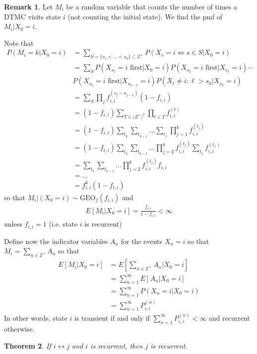 \documentclass[11pt]{amsart}
\newtheorem{theorem}{Theorem}[section]
\theoremstyle{definition}
\newtheorem{remark}[theorem]{Remark}
\numberwithin{equation}{section}
\begin{document}
 \begin{remark}
     Let $M_i$ be a random variable that counts the number of times a DTMC visits state $i$ (not counting the initial state). We find the pmf of $M_i|X_0=i$.

     Note that
     \begin{align*}
         P(M_i=k|X_0=i)&=\sum_{S=\{s_1<\ldots<s_k\}\subset\mathbb Z^+}P(X_s=i\iff s\in S|X_0=i)\\
         &=\sum_{S}P(X_{s_1}=i\text{ first}|X_0=i)P(X_{s_2}=i\text{ first}|X_{s_1}=i)\cdots \\&P(X_{s_k}=i\text{ first}|X_{s_{k-1}}=i)P(X_\ell\ne i:\ell>s_k|X_{s_k}=i)\\
         &=\sum_{S}\prod_jf_{i,i}^{(s_j-s_{j-1})}(1-f_{i,i})\\
         &=(1-f_{i,i})\sum_{T\in\mathbb (Z^+)^k}\prod_{t\in T}f_{i,i}^{(t)}\\
         &=(1-f_{i,i})\sum_{t_k}\sum_{t_{k-1}}\ldots\sum_{t_1}\prod_{j=1}^k f^{(t_j)}_{i,i}\\
         &=(1-f_{i,i})\sum_{t_k}\sum_{t_{k-1}}\ldots\prod_{j=2}^kf_{i,i}^{(t_j)}\sum_{t_1}f_{i,i}^{(t_1)}\\
         &=\sum_{t_k}\sum_{t_{k-1}}\ldots\prod_{j=2}^kf_{i,i}^{(t_j)}f_{i,i}\\
         &=\ldots\\
         &=f_{i,i}^k(1-f_{i,i})
     \end{align*}
     so that $M_i|(X_0=i)\sim\mathrm{GEO}_f(f_{i,i})$ and
     \begin{align*}
         E[M_i|X_0=i]=\frac{f_{i,i}}{1-f_{i,i}}<\infty
     \end{align*}
     unless $f_{i,i}=1$ (i.e. state $i$ is recurrent)

     Define now the indicator variables $A_n$ for the events $X_n=i$ so that $M_i=\sum_{n\in\mathbb Z^+}A_n$ so that
     \begin{align*}
         E[M_i|X_0=i]&=E[\sum_{n\in\mathbb Z^+}A_n|X_0=i]\\
         &=\sum_{n=1}^\infty E[A_n|X_0=i]\\
         &=\sum_{n=1}^\infty P(X_n=i|X_0=i)\\
         &=\sum_{n=1}^\infty P_{i,i}^{(n)}
     \end{align*}
     In other words, state $i$ is transient if and only if $\sum_{n=1}^\infty P_{i,i}^{(n)}<\infty$ and recurrent otherwise.
 \end{remark}
 \begin{theorem}\label{reciff}
     If $i\leftrightarrow j$ and $i$ is recurrent, then $j$ is recurrent.
 \end{theorem}
\end{document}
